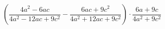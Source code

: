 \begin{ex}[type=expression]
	\begin{condition}
		\( \left( \dfrac{4a^2-6ac}{4a^2-12ac+9c^2}-\dfrac{6ac+9c^2}{4a^2+12ac+9c^2} \right)\cdot\dfrac{6a+9c}{4a^2+9c^2} \)
	\end{condition}
\end{ex}